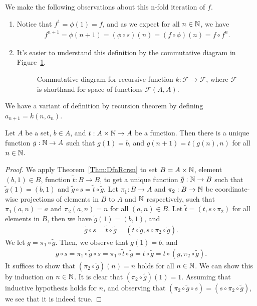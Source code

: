 \documentclass[a4paper,english,12pt]{article}
\begin{document}
\begin{rem} We make the following observations about this n-fold iteration of $f$.
\begin{enumerate}
	\item Notice that $f^1 = \phi(1) = f$, and as we expect for all $n\in \mathbb{N}$, we have
\begin{align*}
f^{n+1} = \phi(n+1) = (\phi \circ s)(n) = (f \circ \phi)(n) = f \circ f^n.
\end{align*}
	\item It's easier to understand this definition by the commutative diagram in Figure~\ref{Figure:DfnRcrsnN-Fold}.
	\begin{figure}[hhhh]%
	\centering
		\scalebox{1.5}{}
	\caption{Commutative diagram for recursive function $k: \mathcal{F} \to \mathcal{F}$, where $\mathcal{F}$ is shorthand for space of functions $\mathcal{F}(A,A)$.}%
	\label{Figure:DfnRcrsnN-Fold}%
	\end{figure}
\end{enumerate}
\end{rem}
We have a variant of definition by recursion theorem by defining $a_{n+1} = k(n, a_n)$.
\begin{thm}\label{Thm:DR-Var1} Let $A$ be a set, $b \in A$, and $t : A \times \mathbb{N} \to A$ be a function. Then there is a unique function $g: \mathbb{N} \to A$ such that $g(1) = b$, and $g(n + 1) = t(g(n), n)$ for all $n \in \mathbb{N}$.
\end{thm}
\begin{proof} We apply Theorem~\ref{Thm:DfnRcrsn} to set $B = A \times \mathbb{N}$, element $(b,1) \in B$, function $\tilde{t}: B \to B$, to get a unique function $\tilde{g}: \mathbb{N} \to B$ such that $\tilde{g}(1) = (b,1)$ and $\tilde{g} \circ s = \tilde{t} \circ \tilde{g}$. Let $\pi_1: B \to A$  and $\pi_2: B \to \mathbb{N}$ be coordinate-wise projections of elements in $B$ to $A$ and $\mathbb{N}$ respectively, such that $\pi_1(a,n) = a$ and $\pi_2(a,n) = n$ for all $(a,n) \in B$. Let $\tilde{t} = (t,s \circ \pi_2)$ for all elements in $B$, then we have $\tilde{g}(1) = (b,1)$, and 
\begin{align*}
\tilde{g} \circ s = \tilde{t} \circ \tilde{g} = ( t \circ \tilde{g}, s \circ \pi_2 \circ \tilde{g} ). 
\end{align*}
We let $g = \pi_1\circ\tilde{g}$. Then, we observe that $g(1) = b$, and 
\begin{align*}
g \circ s = \pi_1 \circ \tilde{g} \circ s = \pi_1 \circ \tilde{t} \circ \tilde{g} = t \circ \tilde{g} = t \circ (g, \pi_2 \circ \tilde{g}).
\end{align*}
It suffices to show that $(\pi_2 \circ \tilde{g})(n) = n$ holds for all $n \in \mathbb{N}$. We can show this by induction on $n \in \mathbb{N}$. It is clear that $(\pi_2 \circ \tilde{g})(1) = 1$. Assuming that inductive hypothesis holds for $n$, and observing that $(\pi_2\circ\tilde{g} \circ s) = (s \circ \pi_2 \circ \tilde{g})$, we see that it is indeed true.
\end{proof}
\end{document}
